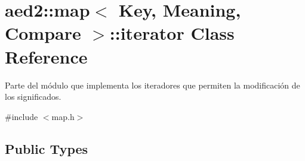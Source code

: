 \hypertarget{classaed2_1_1map_1_1iterator}{}\section{aed2\+:\+:map$<$ Key, Meaning, Compare $>$\+:\+:iterator Class Reference}
\label{classaed2_1_1map_1_1iterator}


Parte del módulo que implementa los iteradores que permiten la modificación de los significados.  




{\ttfamily \#include $<$map.\+h$>$}

\subsection*{Public Types}
